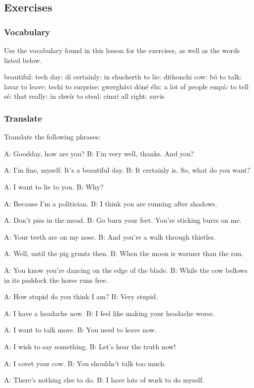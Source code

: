 \newpage
\subsection{Exercises}

\subsubsection{Vocabulary}

Use the vocabulary found in this lesson for the exercises, as well as the words listed below.

beautiful: tech
day: d\'{i}
certainly: in shucherth
to lie: dithonchi
cow: b\'{o}
to talk: lavar
to leave: techi
to surprise: gwergh\'{a}vi
d\'{o}n\'{e} \'{e}lu: a lot of people
emp\'{a}: to tell
s\'{e}: that
really: in chw\'{i}r
to steal: cimri
all right: suvis

\subsubsection{Translate}

Translate the following phrases:

A: Goodday, how are you?
B: I'm very well, thanks. And you?

A: I'm fine, myself. It's a beautiful day.
B: It certainly is. So, what do you want?

A: I want to lie to you.
B: Why?

A: Because I'm a politician.
B: I think you are running after shadows.

A: Don't piss in the mead.
B: Go burn your feet. You're sticking burrs on me.

A: Your teeth are on my nose.
B: And you're a walk through thistles.

A: Well, until the pig grunts then.
B: When the moon is warmer than the sun.

A: You know you're dancing on the edge of the blade.
B: While the cow bellows in its paddock the horse runs free.

A: How stupid do you think I am?
B: Very stupid.

A: I have a headache now.
B: I feel like making your headache worse.

A: I want to talk more.
B: You need to leave now.

A: I wish to say something.
B: Let's hear the truth now!

A: I covet your cow.
B: You shouldn't talk too much.

A: There's nothing else to do.
B: I have lots of work to do myself.

